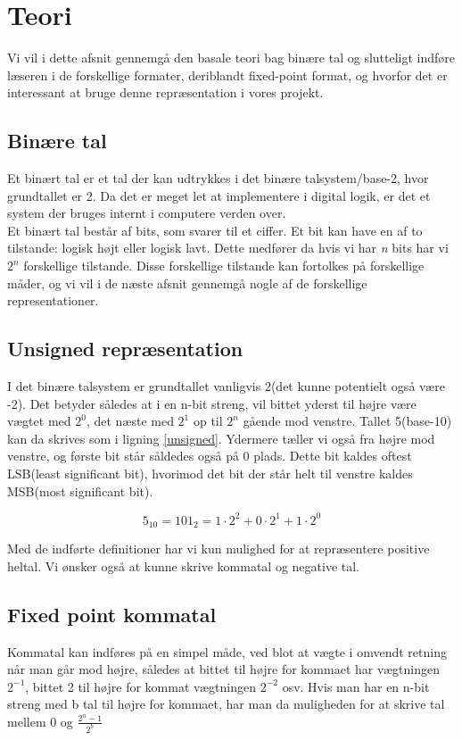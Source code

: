 \section{Teori}

Vi vil i dette afsnit gennemgå den basale teori bag binære tal og slutteligt indføre læseren i de forskellige formater, deriblandt fixed-point format, og hvorfor det er interessant at bruge denne repræsentation  i vores projekt.
\subsection{Binære tal}
Et binært tal er et tal der kan udtrykkes i det binære talsystem/base-2, hvor grundtallet er 2. Da det er meget let at implementere i digital logik, er det et system der bruges internt i computere verden over. \\ 
Et binært tal består af bits, som svarer til et ciffer. Et bit kan have en af to tilstande: logisk højt eller logisk lavt. Dette medfører da hvis vi har \textit{n} bits har vi $2^n$ forskellige tilstande. Disse forskellige tilstande kan fortolkes på forskellige måder, og vi vil i de næste afsnit gennemgå nogle af de forskellige representationer.
\subsection{Unsigned repræsentation}
I det binære talsystem er grundtallet vanligvis 2(det kunne potentielt også være -2). Det betyder således at i en n-bit streng, vil  bittet yderst til højre være vægtet med  $2^0$, det næste med $2^1$ op til $2^n$ gående mod venstre. Tallet 5(base-10) kan da skrives som i ligning \ref{unsigned}. Ydermere tæller vi også fra højre mod venstre, og første bit står såldedes også på 0 plads. Dette bit kaldes oftest LSB(least significant bit), hvorimod det bit der står helt til venstre kaldes MSB(most significant bit).


\begin{equation}\label{unsigned}
5_{10} = 101_{2} = 1 \cdot 2^2+0 \cdot 2^1+1 \cdot 2^0
\end{equation}


Med de indførte definitioner har vi kun mulighed for at repræsentere positive heltal. Vi ønsker også at kunne skrive kommatal og negative tal.

\subsection{Fixed point kommatal}
Kommatal kan indføres på en simpel måde, ved blot at vægte i omvendt retning når man går mod højre, således at bittet til højre for kommaet har vægtningen $2^{-1}$, bittet 2 til højre for kommat vægtningen $2^{-2}$ osv. Hvis man har en n-bit streng med b tal til højre for kommaet, har man da muligheden for at skrive tal mellem 0 og $\frac{2^n-1}{2^b}$ \cite[s.~4]{Yates}


